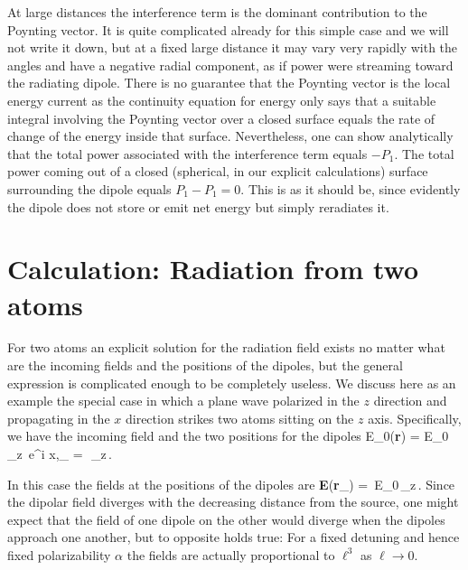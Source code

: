 At large distances the interference term is the dominant contribution to the Poynting vector. It is quite complicated already for this  simple case and we will not write it down, but at a fixed large distance it may vary very rapidly with the angles and have a negative radial component, as if power were streaming toward the radiating dipole. There is  no guarantee that the Poynting vector is the local energy current as the continuity equation for energy only says that a suitable integral involving the Poynting vector over a closed surface equals the rate of change of the energy inside that surface. Nevertheless, one can  show analytically that the total power associated with the interference term equals $-P_1$. The total power coming  out of a closed (spherical, in our explicit calculations) surface surrounding the dipole equals $P_1-P_1=0$. This is as it should be, since evidently the dipole does not store or emit net energy but simply reradiates it.

\section{Calculation: Radiation from two atoms}
For two atoms an explicit solution for the radiation field exists no matter what are the incoming fields and the positions of the dipoles, but the general expression is complicated enough to be  completely useless. We discuss here as an example the special case in which a plane wave polarized in the $z$ direction and propagating in the $x$ direction strikes two atoms sitting on the $z$ axis. Specifically, we have the incoming field and the two positions for the dipoles
\beq
E_0({\bf r}) = E_0\, _z\,  e^{i x},_{\pm} = \pm\half\,\ell\,_z\,.
\eeq

In this case the fields at the positions of the dipoles are
\beq
{\bf E}({\bf r}_\pm) = \,E_0\,_z\,.
\label{FOD}
\eeq
Since the dipolar field diverges with the decreasing distance from the source, one might expect that the field of one dipole on the other would diverge when the dipoles approach one another, but to opposite holds true: For a fixed detuning and hence fixed polarizability $\alpha$ the fields are actually proportional to $\ell^3$ as $\ell\rightarrow0$.

